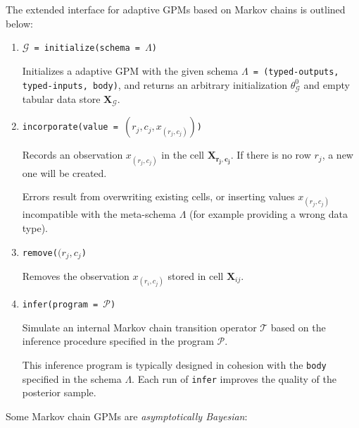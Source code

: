 \documentclass[10pt,letterpaper]{article}
\begin{document}
The extended interface for adaptive GPMs based on Markov chains is outlined
below:

\begin{enumerate}

\item \texttt{$\mathcal{G}$ = initialize(schema = $\Lambda$)}

    Initializes a adaptive GPM with the given schema \texttt{$\Lambda$ =
    (typed-outputs, typed-inputs, body)}, and returns an arbitrary
    initialization $\theta_\mathcal{G}^0$ and empty tabular data store
    $\mathbf{X}_\mathcal{G}$.


\item \texttt{incorporate(value = $(r_j,c_j,x_{(r_j,c_j)})$)}

    Records an observation $x_{(r_j,c_j)}$ in the cell $\mathbf{X_{r_j,c_j}}$.
    If there is no row $r_j$, a new one will be created.

    Errors result from overwriting existing cells, or inserting values
    $x_{(r_j,c_j)}$ incompatible with the meta-schema $\Lambda$ (for example
    providing a wrong data type).

\item \texttt{remove($(r_j,c_j$)}

    Removes the observation $x_{(r_i,c_j)}$ stored in cell $\mathbf{X}_{ij}$.

\item \texttt{infer(program = $\mathcal{P}$)}

    Simulate an internal Markov chain transition operator $\mathcal{T}$ based on
    the inference procedure specified in the program $\mathcal{P}$.

    This inference program is typically designed in cohesion with the
    \texttt{body} specified in the schema $\Lambda$. Each run of \texttt{infer}
    improves the quality of the posterior sample.
\end{enumerate}

Some Markov chain GPMs are \textit{asymptotically Bayesian}:
\end{document}
